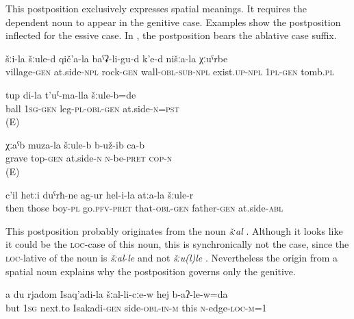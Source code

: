 This postposition exclusively expresses spatial meanings. It requires the dependent noun to appear in the genitive case. Examples  show the postposition inflected for the essive case. In , the postposition bears the ablative case suffix.
%
\begin{exe}
	\ex
	\begin{xlist}
		\ex	\label{Next to the village under a stone wall there is our graveyard}
		\gll	šːi-la	šːule-d	qič'a-la	baˁʡ-li-gu-d	k'e-d	nišːa-la	χːuˁrbe  \\
			village-\textsc{gen}	at.side-\textsc{npl}	rock-\textsc{gen}	wall-\textsc{obl}-\textsc{sub}-\textsc{npl}	exist.\textsc{up-npl}	1\textsc{pl}-\textsc{gen}	tomb.\textsc{pl}\\
		\glt	{}

						\ex	\label{The ball was at my feet.}
		\gll	tup di-la t'uˁ-ma-lla šːule-b=de \\
ball	\textsc{1sg-gen}	leg-\textsc{pl-obl-gen}	at.side-\textsc{n=pst} 	\\
		\glt	{}	(E)		
		
			\ex	\label{The grave was near the top.}
		\gll	χːaˁb muza-la šːule-b b-už-ib ca-b \\
grave	top-\textsc{gen}	at.side-\textsc{n}	\textsc{n}-be-\textsc{pret}	\textsc{cop-n}\\
		\glt	{}	(E)
		
		\ex	\label{Then these boys passed by from his, the father's, side}
		\gll	c'il	hetːi	duˁrħ-ne	ag-ur	hel-i-la	atːa-la šːule-r\\
			then	those	boy-\textsc{pl}	go.\textsc{pfv}-\textsc{pret}	that-\textsc{obl}-\textsc{gen}	father-\textsc{gen} at.side-\textsc{abl}\\
		\glt	{}
		
	\end{xlist}
\end{exe}

This postposition probably originates from the noun \textit{šːal} . Although it looks like it could be the \textsc{loc}-case of this noun, this is synchronically not the case, since the \textsc{loc}-lative of the noun is \textit{šːal}-\textit{le} and not \textit{šːu(l)le} . Nevertheless the origin from a spatial noun explains why the postposition governs only the genitive.
%
\begin{exe}
	\ex	\label{And I am at the side of Isakadi, at this end}
	\gll	a	du	rjadom	Isaq'adi-la	šːal-li-cːe-w	hej	b-aʔ-le-w=da \\
		but	1\textsc{sg}	next.to	Isakadi-\textsc{gen}	side-\textsc{obl}-\textsc{in}-\textsc{m}	this	\textsc{n}-edge-\textsc{loc}-\textsc{m}=1\\
	\glt	{}
\end{exe}


